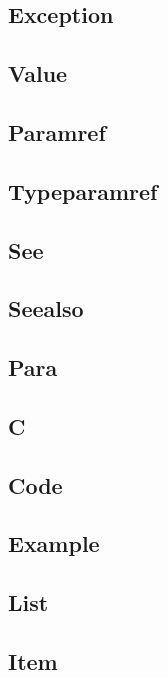 \subsection{Exception}

\subsection{Value}

\subsection{Paramref}

\subsection{Typeparamref}

\subsection{See}

\subsection{Seealso}

\subsection{Para}

\subsection{C}

\subsection{Code}

\subsection{Example}

\subsection{List}

\subsection{Item}

